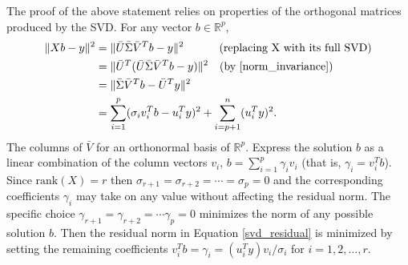 \documentclass[12pt,hidelinks]{article}
\numberwithin{equation}{section}
\begin{document}
The proof of the above statement relies on properties of
the orthogonal matrices produced by the SVD. For any vector $b\in\mathbb{R}^p$,
\begin{align}
\|X b - y\|^2 &= \|\bar{U}\bar{\Sigma}\bar{V}^T b - y\|^2 \qquad\,\,\,\,\,\,\, (\mbox{replacing X with its full SVD})\nonumber\\
&= \|\bar{U}^T(\bar{U}\bar{\Sigma}\bar{V}^T b - y)\|^2 \,\,\,\,\,\, (\mbox{by \ref{norm_invariance}})\nonumber\\
&= \|\bar{\Sigma}\bar{V}^T b - \bar{U}^Ty\|^2 \nonumber \\
&= \sum_{i=1}^p(\sigma_iv_i^T b - u_i^Ty)^2 + \sum_{i=p + 1}^n(u_i^Ty)^2. \label{svd_residual}
\end{align}
The columns of $\bar{V}$ for an orthonormal basis of $\mathbb{R}^p$.
Express the solution $b$ as a linear combination of the column vectors $v_i$,
$b = \sum_{i=1}^p \gamma_i v_i$ (that is, $\gamma_i = v_i^Tb$).
Since $\mathrm{rank}(X)=r$ then
$\sigma_{r+1} = \sigma_{r+2} = \cdots = \sigma_p = 0$ and the corresponding
coefficients $\gamma_i$ may take on any value without affecting the
residual norm.  The specific choice
$\gamma_{r+1} = \gamma_{r+2} = \cdots \gamma_p = 0$
minimizes the norm of any possible solution $b$.
Then the residual norm in Equation \ref{svd_residual} is minimized by setting
the remaining coefficients
$v_i^Tb = \gamma_i = (u_i^T y) v_i/ \sigma_i$ for $i=1, 2, \ldots, r$.
\end{document}
